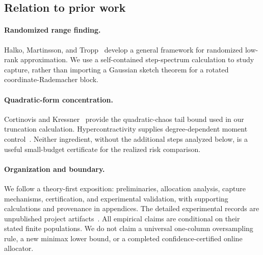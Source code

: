\subsection{Relation to prior work}
\paragraph{Randomized range finding.}
Halko, Martinsson, and Tropp~\cite{halko2011} develop a general framework for
randomized low-rank approximation. We use a self-contained step-spectrum
calculation to study capture, rather than importing a Gaussian sketch
theorem for a rotated coordinate-Rademacher block.

\paragraph{Quadratic-form concentration.}
Cortinovis and Kressner~\cite{cortinovis2022} provide the quadratic-chaos tail
bound used in our truncation calculation. Hypercontractivity supplies
degree-dependent moment control~\cite{odonnell2007}. Neither ingredient,
without the additional steps analyzed below, is a useful small-budget
certificate for the realized risk comparison.

\paragraph{Organization and boundary.}
We follow a theory-first exposition: preliminaries, allocation analysis,
capture mechanisms, certification, and experimental validation, with
supporting calculations and provenance in appendices. The detailed
experimental records are unpublished project artifacts~\cite{project2026}.
All empirical claims are conditional on their stated finite populations.
We do not claim a universal one-column oversampling rule, a new minimax lower
bound, or a completed confidence-certified online allocator.
